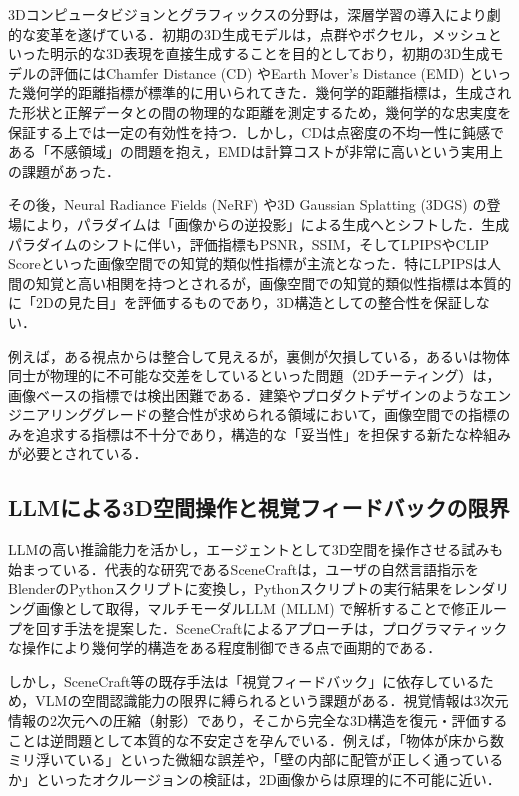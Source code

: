 \documentclass[dvipdfmx, a4paper, 9pt]{deimj}
\begin{document}
3Dコンピュータビジョンとグラフィックスの分野は，深層学習の導入により劇的な変革を遂げている．初期の3D生成モデルは，点群やボクセル，メッシュといった明示的な3D表現を直接生成することを目的としており，初期の3D生成モデルの評価にはChamfer Distance (CD) やEarth Mover's Distance (EMD) といった幾何学的距離指標が標準的に用いられてきた\cite{fan2017point,nichol2022point}．幾何学的距離指標は，生成された形状と正解データとの間の物理的な距離を測定するため，幾何学的な忠実度を保証する上では一定の有効性を持つ．しかし，CDは点密度の不均一性に鈍感である「不感領域」の問題を抱え，EMDは計算コストが非常に高いという実用上の課題があった．

その後，Neural Radiance Fields (NeRF)\cite{mildenhall2020nerf} や3D Gaussian Splatting (3DGS)\cite{kerbl20233dgs} の登場により，パラダイムは「画像からの逆投影」による生成へとシフトした．生成パラダイムのシフトに伴い，評価指標もPSNR，SSIM，そしてLPIPS\cite{zhang2018lpips}やCLIP Score\cite{radford2021clip}といった画像空間での知覚的類似性指標が主流となった．特にLPIPSは人間の知覚と高い相関を持つとされるが，画像空間での知覚的類似性指標は本質的に「2Dの見た目」を評価するものであり，3D構造としての整合性を保証しない．

例えば，ある視点からは整合して見えるが，裏側が欠損している，あるいは物体同士が物理的に不可能な交差をしているといった問題（2Dチーティング）は，画像ベースの指標では検出困難である\cite{poole2022dreamfusion}．建築やプロダクトデザインのようなエンジニアリンググレードの整合性が求められる領域において，画像空間での指標のみを追求する指標は不十分であり，構造的な「妥当性」を担保する新たな枠組みが必要とされている．

\subsection{LLMによる3D空間操作と視覚フィードバックの限界}

LLMの高い推論能力を活かし，エージェントとして3D空間を操作させる試みも始まっている．代表的な研究であるSceneCraft\cite{hu2024scenecraft}は，ユーザの自然言語指示をBlenderのPythonスクリプトに変換し，Pythonスクリプトの実行結果をレンダリング画像として取得，マルチモーダルLLM (MLLM) で解析することで修正ループを回す手法を提案した．SceneCraftによるアプローチは，プログラマティックな操作により幾何学的構造をある程度制御できる点で画期的である．

しかし，SceneCraft等の既存手法は「視覚フィードバック」に依存しているため，VLMの空間認識能力の限界に縛られるという課題がある．視覚情報は3次元情報の2次元への圧縮（射影）であり，そこから完全な3D構造を復元・評価することは逆問題として本質的な不安定さを孕んでいる．例えば，「物体が床から数ミリ浮いている」といった微細な誤差や，「壁の内部に配管が正しく通っているか」といったオクルージョンの検証は，2D画像からは原理的に不可能に近い．
\end{document}
